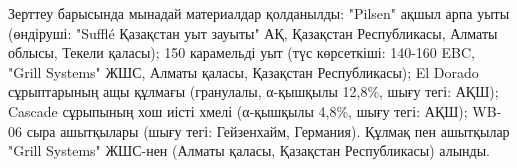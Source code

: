 % 
% 

Зерттеу барысында мынадай материалдар қолданылды: "Pilsen" ақшыл арпа
уыты (өндіруші: "Sufflé Қазақстан уыт зауыты" АҚ, Қазақстан
Республикасы, Алматы облысы, Текели қаласы); 150 карамельді уыт (түс
көрсеткіші: 140-160 EBC, "Grill Systems" ЖШС, Алматы қаласы, Қазақстан
Республикасы); El Dorado сұрыптарының ащы құлмағы (гранулалы, α-қышқылы
12,8\%, шығу тегі: АҚШ); Cascade сұрыпының хош иісті хмелі (α-қышқылы
4,8\%, шығу тегі: АҚШ); WB-06 сыра ашытқылары (шығу тегі: Гейзенхайм,
Германия). Құлмақ пен ашытқылар "Grill Systems" ЖШС-нен (Алматы қаласы,
Қазақстан Республикасы) алынды.

